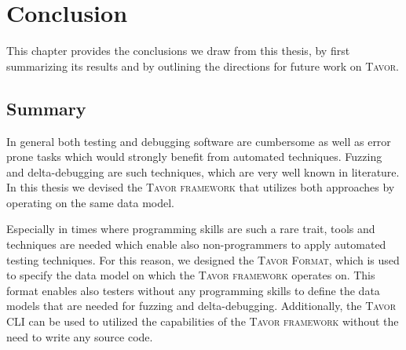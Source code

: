 \chapter{Conclusion}
\label{chapter:conclusion}

This chapter provides the conclusions we draw from this thesis, by first summarizing its results and by outlining the directions for future work on \textsc{Tavor}.

\section{Summary}
\label{sec:summary}

In general both testing and debugging software are cumbersome as well as error prone tasks which would strongly benefit from automated techniques. Fuzzing and delta-debugging are such techniques, which are very well known in literature. In this thesis we devised the \textsc{Tavor framework} that utilizes both approaches by operating on the same data model.

Especially in times where programming skills are such a rare trait, tools and techniques are needed which enable also non-programmers to apply automated testing techniques. For this reason, we designed the \textsc{Tavor Format}, which is used to specify the data model on which the \textsc{Tavor framework} operates on. This format enables also testers without any programming skills to define the data models that are needed for fuzzing and delta-debugging. Additionally, the \textsc{Tavor CLI} can be used to utilized the capabilities of the \textsc{Tavor framework} without the need to write any source code.

